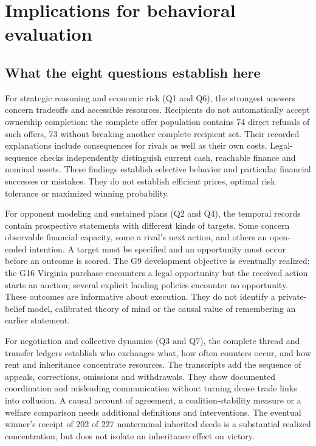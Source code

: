 \section{Implications for behavioral evaluation}
\label{sec:discussion}

\subsection{What the eight questions establish here}

For strategic reasoning and economic risk (Q1 and Q6), the strongest answers concern tradeoffs and accessible resources. Recipients do not automatically accept ownership completion: the complete offer population contains 74 direct refusals of such offers, 73 without breaking another complete recipient set. Their recorded explanations include consequences for rivals as well as their own costs. Legal-sequence checks independently distinguish current cash, reachable finance and nominal assets. These findings establish selective behavior and particular financial successes or mistakes. They do not establish efficient prices, optimal risk tolerance or maximized winning probability.

For opponent modeling and sustained plans (Q2 and Q4), the temporal records contain prospective statements with different kinds of targets. Some concern observable financial capacity, some a rival's next action, and others an open-ended intention. A target must be specified and an opportunity must occur before an outcome is scored. The G9 development objective is eventually realized; the G16 Virginia purchase encounters a legal opportunity but the received action starts an auction; several explicit landing policies encounter no opportunity. These outcomes are informative about execution. They do not identify a private-belief model, calibrated theory of mind or the causal value of remembering an earlier statement.

For negotiation and collective dynamics (Q3 and Q7), the complete thread and transfer ledgers establish who exchanges what, how often counters occur, and how rent and inheritance concentrate resources. The transcripts add the sequence of appeals, corrections, omissions and withdrawals. They show documented coordination and misleading communication without turning dense trade links into collusion. A causal account of agreement, a coalition-stability measure or a welfare comparison needs additional definitions and interventions. The eventual winner's receipt of 202 of 227 nonterminal inherited deeds is a substantial realized concentration, but does not isolate an inheritance effect on victory.

